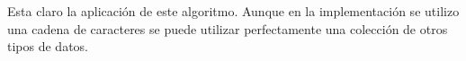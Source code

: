 Esta claro la aplicación de este algoritmo. Aunque en la implementación se utilizo una cadena de caracteres se puede utilizar perfectamente una colección de otros tipos de datos. 